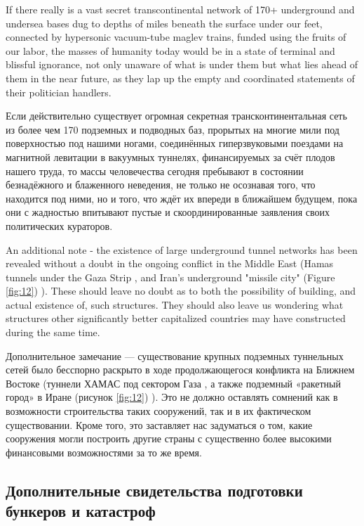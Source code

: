 \documentclass[10pt,twocolumn,letterpaper]{article}
\begin{document}
If there really is a vast secret transcontinental network of 170+ underground and undersea bases dug to depths of miles beneath the surface under our feet, connected by hypersonic vacuum-tube maglev trains, funded using the fruits of our labor, the masses of humanity today would be in a state of terminal and blissful ignorance, not only unaware of what is under them but what lies ahead of them in the near future, as they lap up the empty and coordinated statements of their politician handlers.

Если действительно существует огромная секретная трансконтинентальная сеть из более чем 170 подземных и подводных баз, прорытых на многие мили под поверхностью под нашими ногами, соединённых гиперзвуковыми поездами на магнитной левитации в вакуумных туннелях, финансируемых за счёт плодов нашего труда, то массы человечества сегодня пребывают в состоянии безнадёжного и блаженного неведения, не только не осознавая того, что находится под ними, но и того, что ждёт их впереди в ближайшем будущем, пока они с жадностью впитывают пустые и скоординированные заявления своих политических кураторов.

An additional note - the existence of large underground tunnel networks has been revealed without a doubt in the ongoing conflict in the Middle East (Hamas tunnels under the Gaza Strip \cite{38}, and Iran's underground "missile city" (Figure \ref{fig:12}) \cite{39,40}). These should leave no doubt as to both the possibility of building, and actual existence of, such structures. They should also leave us wondering what structures other significantly better capitalized countries may have constructed during the same time.

Дополнительное замечание — существование крупных подземных туннельных сетей было бесспорно раскрыто в ходе продолжающегося конфликта на Ближнем Востоке (туннели ХАМАС под сектором Газа \cite{38}, а также подземный «ракетный город» в Иране (рисунок \ref{fig:12}) \cite{39,40}). Это не должно оставлять сомнений как в возможности строительства таких сооружений, так и в их фактическом существовании. Кроме того, это заставляет нас задуматься о том, какие сооружения могли построить другие страны с существенно более высокими финансовыми возможностями за то же время.

\subsection{Дополнительные свидетельства подготовки бункеров и катастроф}
\end{document}
